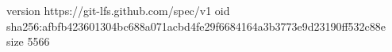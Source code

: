 version https://git-lfs.github.com/spec/v1
oid sha256:afbfb423601304bc688a071acbd4fe29f6684164a3b3773e9d23190ff532c88e
size 5566
